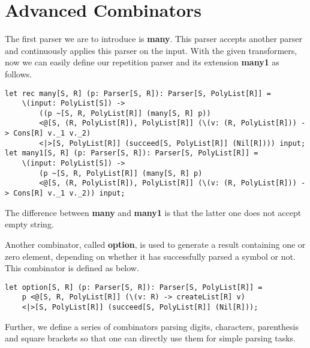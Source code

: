 \section{Advanced Combinators}
The first parser we are to introduce is \textbf{many}. This parser accepts another parser and continuously applies this parser on the input. With the given transformers, now we can easily define our repetition parser and its extension \textbf{many1} as follows.
\begin{lstlisting}
let rec many[S, R] (p: Parser[S, R]): Parser[S, PolyList[R]] =
	\(input: PolyList[S]) ->
		((p ~[S, R, PolyList[R]] (many[S, R] p)) 
		<@[S, (R, PolyList[R]), PolyList[R]] (\(v: (R, PolyList[R])) -> Cons[R] v._1 v._2)
		<|>[S, PolyList[R]] (succeed[S, PolyList[R]] (Nil[R]))) input;
let many1[S, R] (p: Parser[S, R]): Parser[S, PolyList[R]] =
	\(input: PolyList[S]) ->
		(p ~[S, R, PolyList[R]] (many[S, R] p)
		<@[S, (R, PolyList[R]), PolyList[R]] (\(v: (R, PolyList[R])) -> Cons[R] v._1 v._2)) input;
\end{lstlisting}
The difference between \textbf{many} and \textbf{many1} is that the latter one does not accept empty string.

Another combinator, called \textbf{option}, is used to generate a result containing one or zero element, depending on whether it has successfully parsed a symbol or not. This combinator is defined as below.
\begin{lstlisting}
let option[S, R] (p: Parser[S, R]): Parser[S, PolyList[R]] =
	p <@[S, R, PolyList[R]] (\(v: R) -> createList[R] v)
	<|>[S, PolyList[R]] (succeed[S, PolyList[R]] (Nil[R]));
\end{lstlisting}
Further, we define a series of combinators parsing digits, characters, parenthesis and square brackets so that one can directly use them for simple parsing tasks.

